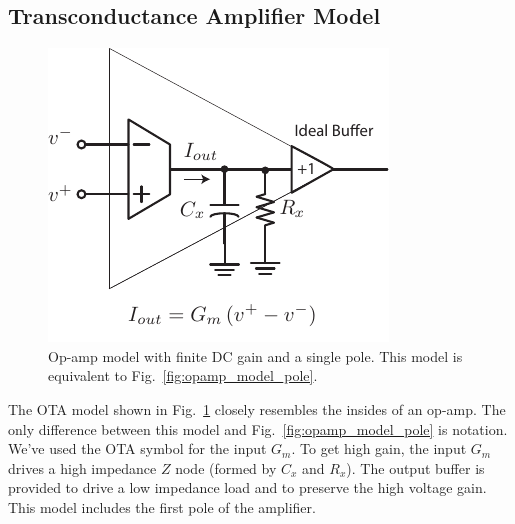 \subsection{Transconductance Amplifier Model}
\begin{figure}[tb]
\begin{center}
\includegraphics[width=.5\columnwidth]{opamp_ota_model_gain}
\end{center}
\caption{Op-amp model with finite DC gain and a single pole. This model is equivalent to Fig.~\ref{fig:opamp_model_pole}.}
\label{fig:opamp_ota_model_gain}
\end{figure}

The OTA model shown in Fig.~\ref{fig:opamp_ota_model_gain} closely resembles the insides of an op-amp.  The only difference between this model and Fig.~\ref{fig:opamp_model_pole} is notation.  We've used the OTA symbol for the input $G_m$.  To get high gain, the input $G_m$ drives a high impedance $Z$ node (formed by $C_x$ and $R_x$). The output buffer is provided to drive a low impedance load and to preserve the high voltage gain.  This model includes the first pole of the amplifier.
%
%
